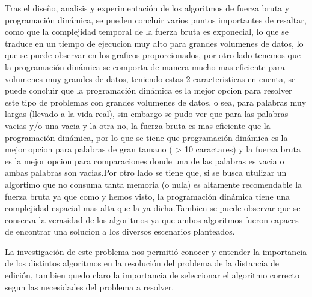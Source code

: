 Tras el diseño, analisis y experimentación de los algoritmos de fuerza bruta y programación dinámica, se pueden concluir varios 
puntos importantes de resaltar, como que la complejidad temporal de la fuerza bruta es exponecial, lo que se traduce en un 
tiempo de ejecucion muy alto para grandes volumenes de datos, lo que se puede observar en los graficos proporcionados, por 
otro lado tenemos que la programación dinámica se comporta de manera mucho mas eficiente para volumenes muy grandes de datos,
teniendo estas 2 caracteristicas en cuenta, se puede concluir que la programación dinámica es la mejor opcion para resolver
este tipo de problemas con grandes volumenes de datos, o sea, para palabras muy largas (llevado a la vida real), sin embargo
se pudo ver que para las palabras vacias y/o una vacia y la otra no, la fuerza bruta es mas eficiente que la programación dinámica,
por lo que se tiene que programación dinámica es la mejor opcion para palabras de gran tamano ( > 10 caractares) y la fuerza bruta
es la mejor opcion para comparaciones donde una de las palabras es vacia o ambas palabras son vacias.Por otro lado
se tiene que, si se busca utulizar un algortimo que no consuma tanta memoria (o nula) es altamente recomendable la fuerza bruta
ya que como y hemos visto, la programación dinámica tiene una complejidad espacial mas alta que la ya dicha.Tambien se puede observar 
que se conserva la verasidad de los algoritmos ya que ambos algoritmos fueron capaces de encontrar una solucion a los diversos 
escenarios planteados.


La investigación de este problema nos permitió conocer y entender la importancia de los distintos algoritmos en la resolución del
problema de la distancia de edición, tambien quedo claro la importancia de seleccionar el algoritmo correcto segun las necesidades
del problema a resolver.